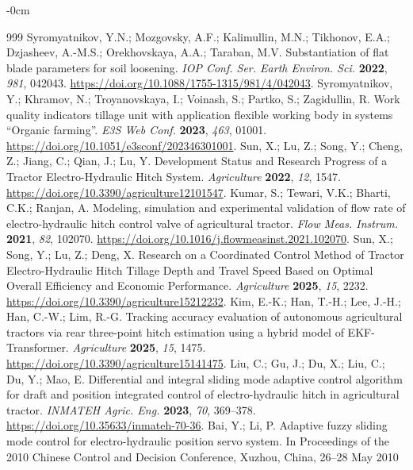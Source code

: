 \documentclass[machines,article,submit,pdftex,moreauthors]{Definitions/mdpi}
\begin{document}
\begin{adjustwidth}{-\extralength}{0cm}

\begin{thebibliography}{999}
 Syromyatnikov, Y.N.; Mozgovsky, A.F.; Kalimullin, M.N.; Tikhonov, E.A.; Dzjasheev, A.-M.S.; Orekhovskaya, A.A.; Taraban, M.V. Substantiation of flat blade parameters for soil loosening. \emph{IOP Conf. Ser. Earth Environ. Sci.} \textbf{2022}, \emph{981}, 042043. \url{https://doi.org/10.1088/1755-1315/981/4/042043}.
 Syromyatnikov, Y.; Khramov, N.; Troyanovskaya, I.; Voinash, S.; Partko, S.; Zagidullin, R. Work quality indicators tillage unit with application flexible working body in systems ``Organic farming''. \emph{E3S Web Conf.} \textbf{2023}, \emph{463}, 01001. \url{https://doi.org/10.1051/e3sconf/202346301001}.
 Sun, X.; Lu, Z.; Song, Y.; Cheng, Z.; Jiang, C.; Qian, J.; Lu, Y. Development Status and Research Progress of a Tractor Electro-Hydraulic Hitch System. \emph{Agriculture} \textbf{2022}, \emph{12}, 1547. \url{https://doi.org/10.3390/agriculture12101547}.
 Kumar, S.; Tewari, V.K.; Bharti, C.K.; Ranjan, A. Modeling, simulation and experimental validation of flow rate of electro-hydraulic hitch control valve of agricultural tractor. \emph{Flow Meas. Instrum.} \textbf{2021}, \emph{82}, 102070. \url{https://doi.org/10.1016/j.flowmeasinst.2021.102070}.
 Sun, X.; Song, Y.; Lu, Z.; Deng, X. Research on a Coordinated Control Method of Tractor Electro-Hydraulic Hitch Tillage Depth and Travel Speed Based on Optimal Overall Efficiency and Economic Performance. \emph{Agriculture} \textbf{2025}, \emph{15}, 2232. \url{https://doi.org/10.3390/agriculture15212232}.
 Kim, E.-K.; Han, T.-H.; Lee, J.-H.; Han, C.-W.; Lim, R.-G. Tracking accuracy evaluation of autonomous agricultural tractors via rear three-point hitch estimation using a hybrid model of EKF-Transformer. \emph{Agriculture} \textbf{2025}, \emph{15}, 1475. \url{https://doi.org/10.3390/agriculture15141475}.
 Liu, C.; Gu, J.; Du, X.; Liu, C.; Du, Y.; Mao, E. Differential and integral sliding mode adaptive control algorithm for draft and position integrated control of electro-hydraulic hitch in agricultural tractor. \emph{INMATEH Agric. Eng.} \textbf{2023}, \emph{70}, 369--378. \url{https://doi.org/10.35633/inmateh-70-36}.
 Bai, Y.; Li, P. Adaptive fuzzy sliding mode control for electro-hydraulic position servo system. In Proceedings of the 2010 Chinese Control and Decision Conference, Xuzhou, China, 26--28 May 2010


\end{thebibliography}
\end{adjustwidth}
\end{document}
